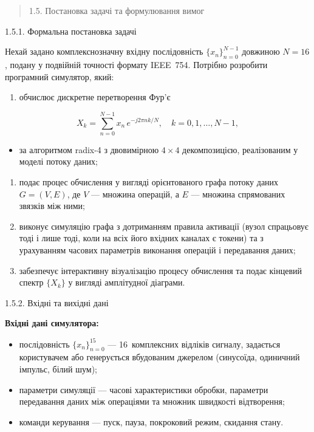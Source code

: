\begin{quote}
\protect{}\label{_Toc229682909}{}1.5. Постановка задачі та
формулювання вимог
\end{quote}

1.5.1. Формальна постановка задачі

Нехай задано комплекснозначну вхідну послідовність
\(\{ x_{n}\}_{n = 0}^{N - 1}\) довжиною \(N = 16\), подану у подвійній
точності формату IEEE~754. Потрібно розробити програмний симулятор,
який:

\begin{enumerate}
\def\labelenumi{\arabic{enumi}.}
\item
  обчислює дискретне перетворення Фур'є
\end{enumerate}

\[X_{k} = \sum_{n = 0}^{N - 1}x_{n}\, e^{- j2\pi nk/N},\quad k = 0,1,\ldots,N - 1,\]

\begin{itemize}
\item
  за алгоритмом radix-4 з двовимірною \(4 \times 4\) декомпозицією,
  реалізованим у моделі потоку даних;
\end{itemize}

\begin{enumerate}
\def\labelenumi{\arabic{enumi}.}
\item
  подає процес обчислення у вигляді орієнтованого графа потоку даних
  \(G = (V,E)\), де \(V\) --- множина операцій, а \(E\) --- множина
  спрямованих зв\textquotesingle язків між ними;
\item
  виконує симуляцію графа з дотриманням правила активації (вузол
  спрацьовує тоді і лише тоді, коли на всіх його вхідних каналах є
  токени) та з урахуванням часових параметрів виконання операцій і
  передавання даних;
\item
  забезпечує інтерактивну візуалізацію процесу обчислення та подає
  кінцевий спектр \(\{ X_{k}\}\) у вигляді амплітудної діаграми.
\end{enumerate}

1.5.2. Вхідні та вихідні дані

\textbf{Вхідні дані симулятора:}

\begin{itemize}
\item
  послідовність \(\{ x_{n}\}_{n = 0}^{15}\) --- 16~комплексних відліків
  сигналу, задається користувачем або генерується вбудованим джерелом
  (синусоїда, одиничний імпульс, білий шум);
\item
  параметри симуляції --- часові характеристики обробки, параметри
  передавання даних між операціями та множник швидкості відтворення;
\item
  команди керування --- пуск, пауза, покроковий режим, скидання стану.
\end{itemize}

